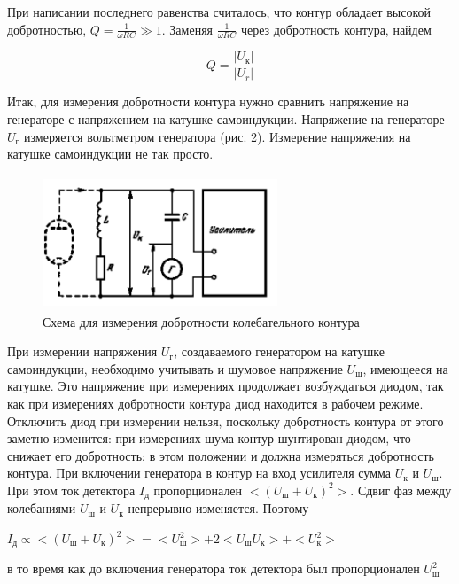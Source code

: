 \documentclass[12pt,a4paper]{article}
\begin{document}
\par При написании последнего равенства считалось, что контур обладает высокой добротностью, $Q = \frac{1}{\omega{RC}} \gg 1$. Заменяя $\frac{1}{\omega{RC}}$ через добротность контура, найдем 

\begin{equation}\label{Q_fin}
Q = \frac{|U_\text{к}|}{|U_r|}
\end{equation}

\par Итак, для измерения добротности контура нужно сравнить напряжение на генераторе с напряжением на катушке самоиндукции. Напряжение на генераторе $U_\text{г}$ измеряется вольтметром генератора (рис. 2). Измерение напряжения на катушке самоиндукции не так просто. 

\begin{figure}
	\vspace{-4ex}
	\includegraphics[width=7cm, height=4cm]{VPV-3_3}
	\centering \caption{Схема для измерения
добротности колебательного контура}
	\label{img3}
\end{figure}	 

\par При измерении напряжения $U_\text{г}$, создаваемого генератором на катушке самоиндукции, необходимо учитывать и шумовое напряжение $U_\text{ш}$, имеющееся на катушке. Это напряжение при измерениях продолжает возбуждаться диодом, так как при измерениях добротности контура диод находится в рабочем режиме. Отключить диод при измерении нельзя, поскольку добротность контура от этого заметно изменится: при измерениях шума контур шунтирован диодом, что снижает его добротность; в этом положении и должна измеряться добротность контура. При включении генератора в контур на вход усилителя сумма $U_\text{к}$ и $U_\text{ш}$. При этом ток детектора $I_\text{д}$ пропорционален $<(U_\text{ш} + U_\text{к})^2>$. Сдвиг фаз между колебаниями $U_\text{ш}$ и $U_\text{к}$ непрерывно изменяется. Поэтому

\begin{center}
$I_\text{д} \varpropto <(U_\text{ш} + U_\text{к})^2> = <U_\text{ш}^2> + 2<U_\text{ш}U_\text{к}> + <U_\text{к}^2>$
\end{center}
в то время как до включения генератора ток детектора был пропорционален $U_\text{ш}^2$
\end{document}
